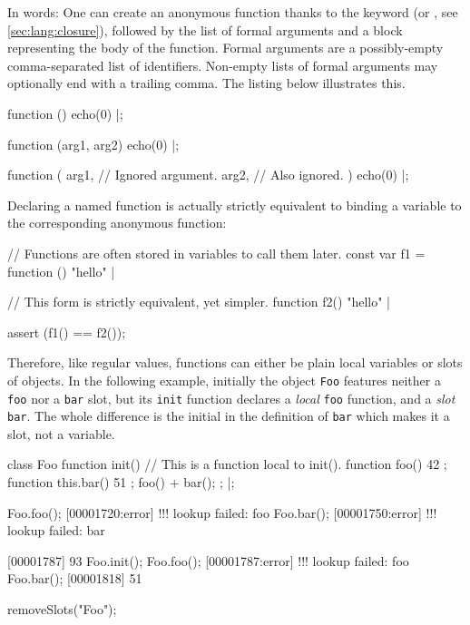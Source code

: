 
In words: One can create an anonymous function thanks to the
 keyword (or , see
\autoref{sec:lang:closure}), followed by the list of formal arguments and a
block representing the body of the function.  Formal arguments are a
possibly-empty comma-separated list of identifiers.  Non-empty lists of
formal arguments may optionally end with a trailing comma. The listing below
illustrates this.

\begin{urbiscript}
function () { echo(0) }|;

function (arg1, arg2) { echo(0) }|;

function (
           arg1, // Ignored argument.
           arg2, // Also ignored.
          )
{
  echo(0)
}|;
\end{urbiscript}

Declaring a named function is actually strictly equivalent to binding a
variable to the corresponding anonymous function:

\begin{urbiscript}
// Functions are often stored in variables to call them later.
const var f1 = function () { "hello" }|

// This form is strictly equivalent, yet simpler.
function f2() { "hello" }|

assert (f1() == f2());
\end{urbiscript}

Therefore, like regular values, functions can either be plain local
variables or slots of objects.  In the following example, initially the
object \lstinline{Foo} features neither a \lstinline{foo} nor a
\lstinline{bar} slot, but its \lstinline{init} function declares a
\emph{local} \lstinline{foo} function, and a \emph{slot} \lstinline{bar}.
The whole difference is the initial \this in the definition of
\lstinline{bar} which makes it a slot, not a variable.

\begin{urbiscript}
class Foo
{
  function init()
  {
    // This is a function local to init().
    function foo()      { 42 };
    function this.bar() { 51 };
    foo() + bar();
  };
}|;

Foo.foo();
[00001720:error] !!! lookup failed: foo
Foo.bar();
[00001750:error] !!! lookup failed: bar

[00001787] 93
Foo.init();
Foo.foo();
[00001787:error] !!! lookup failed: foo
Foo.bar();
[00001818] 51
\end{urbiscript}
\begin{urbicomment}
removeSlots("Foo");
\end{urbicomment}

